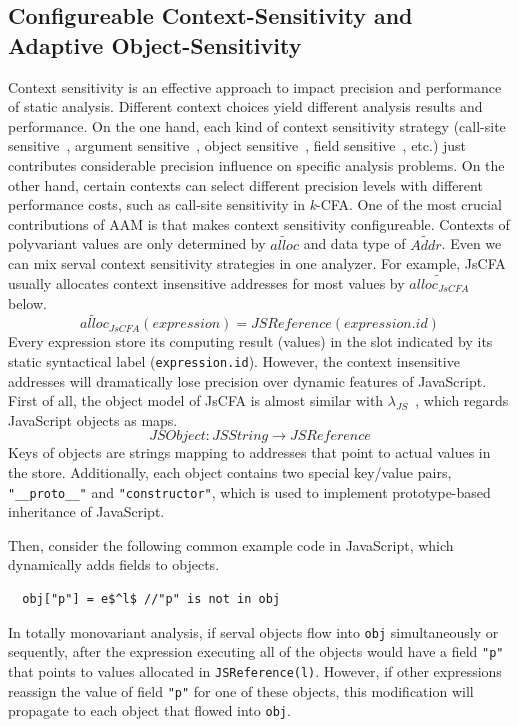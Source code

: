 \documentclass{article}
\begin{document}
\subsection{Configureable Context-Sensitivity and Adaptive Object-Sensitivity}
\label{sub:Configureable}
Context sensitivity is an effective approach to impact precision and performance of static analysis.
Different context choices yield different analysis results and performance.
On the one hand, each kind of context sensitivity strategy (call-site sensitive~\cite{shivers1991control}, argument sensitive~\cite{agesen1995cartesian}, object sensitive~\cite{milanova2005parameterized, smaragdakis2011pick}, field sensitive~\cite{lhotak2003scaling}, etc.) just contributes considerable precision influence on specific analysis problems.
On the other hand, certain contexts can select different precision levels with different performance costs, such as call-site sensitivity in \textit{k}-CFA\@.
One of the most crucial contributions of AAM is that makes context sensitivity configureable.
Contexts of polyvariant values are only determined by $\widetilde{alloc}$ and data type of $\widetilde{Addr}$. %
Even we can mix serval context sensitivity strategies in one analyzer.
For example, JsCFA usually allocates context insensitive addresses for most values by $\widetilde{alloc_{JsCFA}}$ below.
\[
\widetilde{alloc}_{JsCFA}(expression) = JSReference(expression.id)
\]
Every expression store its computing result (values) in the slot indicated by its static syntactical label (\verb|expression.id|).
However, the context insensitive addresses will dramatically lose precision over dynamic features of JavaScript.
First of all, the object model of JsCFA is almost similar with $\lambda_{JS}$~\cite{guha2010essence}, which regards JavaScript objects as maps.
\[
JSObject : JSString \to JSReference
\]
Keys of objects are strings mapping to addresses that point to actual values in the store.
Additionally, each object contains two special key/value pairs, \verb|"__proto__"| and \verb|"constructor"|, which is used to implement prototype-based inheritance of JavaScript.

Then, consider the following common example code in JavaScript, which dynamically adds fields to objects.
\lstset{mathescape}
\begin{lstlisting}
  obj["p"] = e$^l$ //"p" is not in obj
\end{lstlisting}
In totally monovariant analysis, if serval objects flow into \verb|obj| simultaneously or sequently, after the expression executing all of the objects would have a field \verb|"p"| that points to values allocated in \verb|JSReference(l)|.
However, if other expressions reassign the value of field \verb|"p"| for one of these objects, this modification will propagate to each object that flowed into \verb|obj|.
\end{document}
